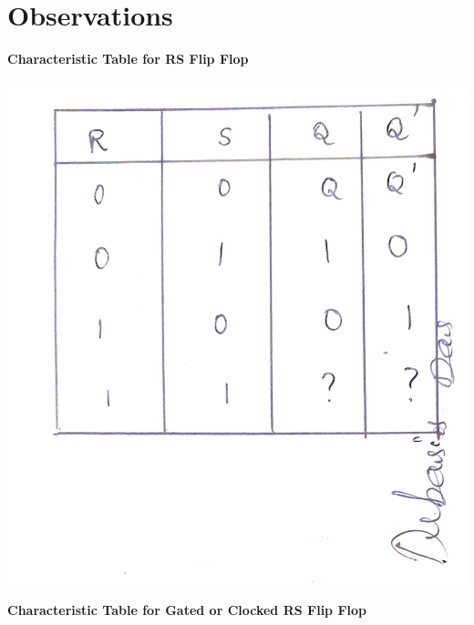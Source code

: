\section{Observations}
\begin{center}
    \textbf{Characteristic Table for RS Flip Flop}
\end{center}
\begin{center}
    \includegraphics[scale = 0.15]{Documents/tabrs_1 (1).jpg}
\end{center}
\clearpage
\begin{center}
    \textbf{Characteristic Table for Gated or Clocked RS Flip Flop}
\end{center}
